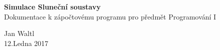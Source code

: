 \begin{titlepage}
	\begin{center}
		\vspace*{8cm}
		\Huge{\textbf{Simulace Sluneční soustavy}}\\
		\vspace*{1cm}
		{\Large Dokumentace k zápočtovému programu pro předmět Programování I}\\
		\vfill
		
		\huge{Jan Waltl}\\
		\huge{12.Ledna 2017}
	\end{center}
\end{titlepage}
	
